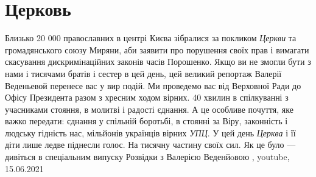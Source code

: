  
 
 
 
 
\chapter{Церковь}
\label{sec:slova.cerkov}

Близько 20 000 православних в центрі Києва зібралися за покликом \emph{Церкви} та
громадянського союзу Миряни, аби заявити про порушення своїх прав і вимагати
скасування дискримінаційних законів часів Порошенко.  Якщо ви не змогли бути з
нами і тисячами братів і сестер в цей день, цей великий репортаж Валерії
Веденьевой перенесе вас у вир подій. Ми проведемо вас від Верховної Ради до
Офісу Президента разом з хресним ходом вірних. 40 хвилин в спілкуванні з
учасниками стояння, в молитві і радості єднання. А це особливе почуття, яке
важко передати: єднання у спільній боротьбі, в стоянні за Віру, законність і
людську гідність нас, мільйонів українців вірних \emph{УПЦ}.  У цей день \emph{Церква} і її
діти лише ледве піднесли голос. На тисячну частину своїх сил.  Як це було —
дивіться в спеціальним випуску Розвідки з Валерією Веденйoвою
,
youtube, 15.06.2021

